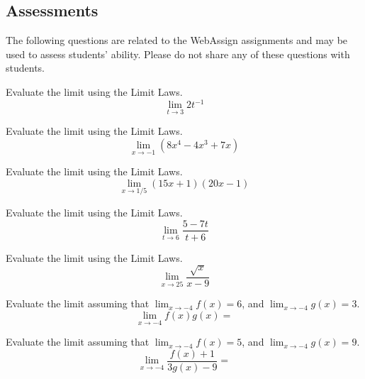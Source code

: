 \documentclass[12pt,addpoints, answers, fleqn]{exam}
\begin{document}
\begin{teacher}
\subsection{Assessments}
The following questions are related to the WebAssign assignments and may be used to assess students' ability. Please do not share any of these questions with students.
\begin{questions}	
\question 	%

Evaluate the limit using the Limit Laws.
\[
\lim_{t \to 3} 2t^{-1}
\]
\begin{solution}
\end{solution}

\question 	%

Evaluate the limit using the Limit Laws.
\[
\lim_{x \to -1} \left( 8x^4 - 4x^3 + 7x \right)
\]
\begin{solution}
\end{solution}
\question 	%


Evaluate the limit using the Limit Laws.
\[
\lim_{x \to 1/5} \left( 15x + 1 \right) \left( 20x -1\right)
\]
\begin{solution}
\end{solution}
\question 	%

Evaluate the limit using the Limit Laws.
\[
\lim_{t \to 6} \frac{5-7t}{t+6}
\]

\begin{solution}
\end{solution}
\question 	%

Evaluate the limit using the Limit Laws.
\[
\lim_{x \to 25} \frac{\sqrt{x}}{x-9}
\]
\begin{solution}
\end{solution}
\question 	%

Evaluate the limit assuming that $\displaystyle \lim_{x \to -4} f\left(x\right) = 6$, and $\displaystyle \lim_{x \to -4} g\left(x\right) = 3$.
\[
\lim_{x \to -4} f\left(x\right) g\left(x\right) =
\]
\begin{solution}
\end{solution}
\question 	%

Evaluate the limit assuming that $\displaystyle \lim_{x \to -4} f\left(x\right) = 5$, and $\displaystyle \lim_{x \to -4} g\left(x\right) = 9$.
\[
\lim_{x \to -4} \frac{f\left( x \right) + 1}{3 g\left(x \right) - 9} =
\]
\begin{solution}
\end{solution}
\question 	%


\end{questions}
\end{teacher}
\end{document}
